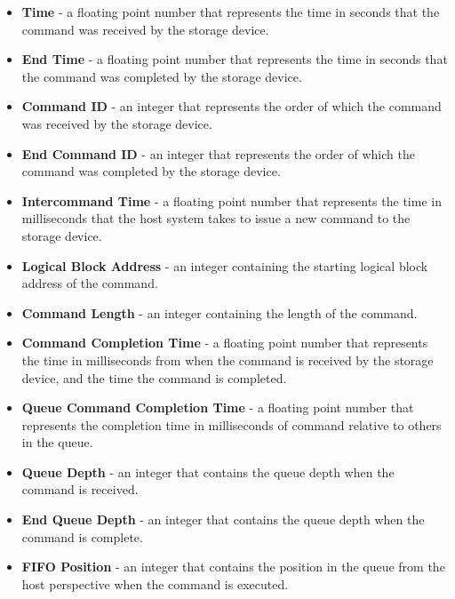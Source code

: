 \documentclass[12pt]{ucthesis}
\begin{document}
\begin{itemize}
\item \textbf{Time} - a floating point number that represents the time in seconds that the command was received by the storage device.

\item \textbf{End Time} - a floating point number that represents the time in seconds that the command was completed by the storage device.

\item \textbf{Command ID} - an integer that represents the order of which the command was received by the storage device.

\item \textbf{End Command ID} - an integer that represents the order of which the command was completed by the storage device.

\item \textbf{Intercommand Time} - a floating point number that represents the time in milliseconds that the host system takes to issue a new command to the storage device.

\item \textbf{Logical Block Address} - an integer containing the starting logical block address of the command.

\item \textbf{Command Length} - an integer containing the length of the command.

\item \textbf{Command Completion Time} - a floating point number that represents the time in milliseconds from when the command is received by the storage device, and the time the command is completed.

\item \textbf{Queue Command Completion Time} - a floating point number that represents the completion time in milliseconds of command relative to others in the queue.

\item \textbf{Queue Depth} - an integer that contains the queue depth when the command is received.

\item \textbf{End Queue Depth} - an integer that contains the queue depth when the command is complete.

\item \textbf{FIFO Position} - an integer that contains the position in the queue from the host perspective when the command is executed.


\end{itemize}
\end{document}

